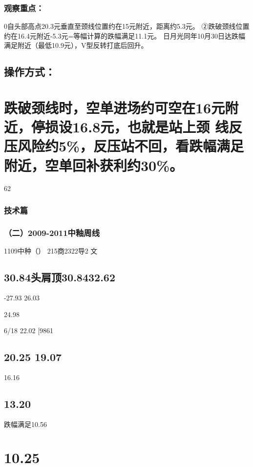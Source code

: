 \documentclass{article}
\begin{document}
\subsubsection{观察重点：}

0自头部高点20.3元垂直至颈线位置约在15元附近，距离约5.3元。 ②跌破颈线位置约在16.4元附近-5.3元=等幅计算的跌幅满足11.1元。 日月光同年10月30日达跌幅满足附近（最低10.9元），V型反转打底后回升。

\subsection{操作方式：}

\section{跌破颈线时，空单进场约可空在16元附近，停损设16.8元，也就是站上颈 线反压风险约5\%，反压站不回，看跌幅满足附近，空单回补获利约30\%。}

62

\clearpage

\subsubsection{技术篇}

\subsubsection{（二）2009-2011中釉周线}

1109中种（） 215商2322导2 文

\subsection{30.84头肩顶30.8432.62}

-27.93 26.03

24.98

6/18 22.02 [9861

\subsection{20.25 19.07}

16.16

\subsection{13.20}

跌幅满足10.56

\section{10.25}
\end{document}
